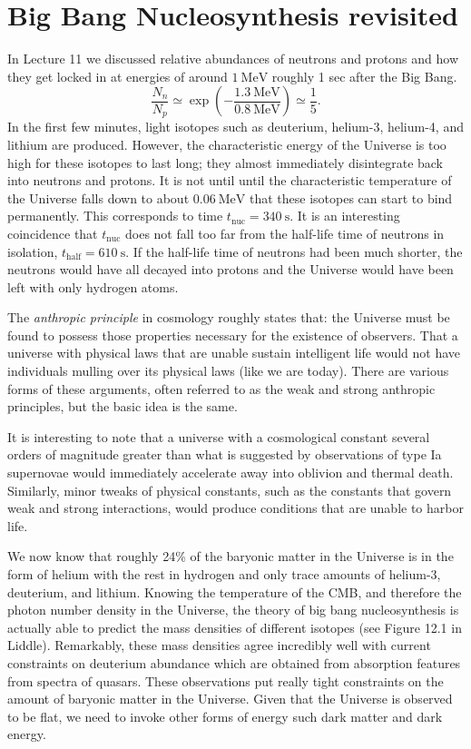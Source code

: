 \documentclass[a4paper,12pt]{article}
\theoremstyle{remark}
\newcommand{\mrm}[1]{\mathrm{#1}}
\renewcommand{\=}[1]{\stackrel{#1}{=}} %
\theoremstyle{plain}
\theoremstyle{definition}
\begin{document}
\section{Big Bang Nucleosynthesis revisited}

In Lecture 11 we discussed relative abundances of neutrons and protons and how they get locked in at energies of around $1 \:\mrm{MeV}$ roughly 1 sec after the Big Bang. 
\begin{equation}
\frac{N_n}{N_p} \simeq \exp \left( - \frac{1.3 \:\mrm{MeV}}{0.8 \:\mrm{MeV}} \right) \simeq \frac{1}{5}. 
\end{equation}
In the first few minutes, light isotopes such as deuterium, helium-3, helium-4, and lithium are produced. However, the characteristic energy of the Universe is too high for these isotopes to last long; they almost immediately disintegrate back into neutrons and protons. It is not until until the characteristic temperature of the Universe falls down to about $0.06 \:\mrm{MeV}$ that these isotopes can start to bind permanently. This corresponds to time $t_\mrm{nuc} = 340 \:\mrm{s}$. It is an interesting coincidence that $t_\mrm{nuc}$ does not fall too far from the half-life time of neutrons in isolation, $t_\mrm{half} = 610 \:\mrm{s}$. If the half-life time of neutrons had been much shorter, the neutrons would have all decayed into protons and the Universe would have been left with only hydrogen atoms.

The \textit{anthropic principle} in cosmology roughly states that: the Universe must be found to possess those properties necessary for the existence of observers. That a universe with physical laws that are unable sustain intelligent life would not have individuals mulling over its physical laws (like we are today). There are various forms of these arguments, often referred to as the weak and strong anthropic principles, but the basic idea is the same. 

It is interesting to note that a universe with a cosmological constant several orders of magnitude greater than what is suggested by observations of type Ia supernovae would immediately accelerate away into oblivion and thermal death. Similarly, minor tweaks of physical constants, such as the constants that govern weak and strong interactions, would produce conditions that are unable to harbor life.

We now know that roughly 24\% of the baryonic matter in the Universe is in the form of helium with the rest in hydrogen and only trace amounts of helium-3, deuterium, and lithium. Knowing the temperature of the CMB, and therefore the photon number density in the Universe, the theory of big bang nucleosynthesis is actually able to predict the mass densities of different isotopes (see Figure 12.1 in Liddle). Remarkably, these mass densities agree incredibly well with current constraints on deuterium abundance which are obtained from absorption features from spectra of quasars. These observations put really tight constraints on the amount of baryonic matter in the Universe. Given that the Universe is observed to be flat, we need to invoke other forms of energy such dark matter and dark energy.
\end{document}
